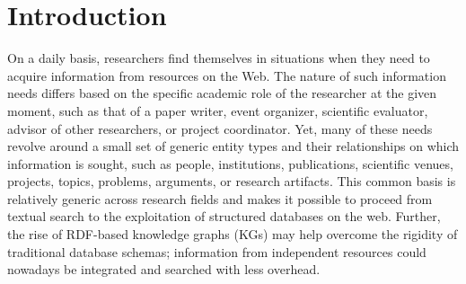 \section{Introduction}

On a daily basis, researchers find themselves in situations when they need to acquire %
information from resources on the Web. 
The nature of such information needs differs based on the specific academic role of the researcher at the given moment, such as  that of a paper writer, event organizer, scientific evaluator, advisor of other %
researchers, or %
project coordinator. 
Yet, many of these needs revolve around a small set of generic entity types and their relationships on which information is sought, such as people, institutions, publications, scientific venues, projects, topics, problems, arguments, or research artifacts. 
This common basis is relatively generic across research fields and makes it possible to proceed from textual search to the exploitation of structured databases on the web. 
Further, the rise of RDF-based knowledge graphs (KGs) may help overcome the rigidity of traditional database schemas; %
information from independent resources could nowadays be integrated and searched with less overhead. 
%
